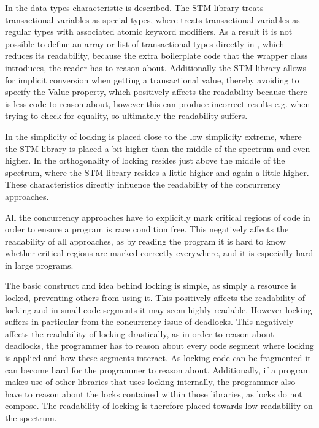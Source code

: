 In  the data types characteristic is described. The \ac{STM} library treats transactional variables as special types, where \stmname treats transactional variables as regular types with associated atomic keyword modifiers. As a result it is not possible to define an array or list of transactional types directly in \stmname, which reduces its readability, because the extra boilerplate code that the wrapper class introduces, the reader has to reason about. Additionally the \ac{STM} library allows for implicit conversion when getting a transactional value, thereby avoiding to specify the Value property, which positively affects the readability because there is less code to reason about, however this can produce incorrect results e.g. when trying to check for equality, so ultimately the readability suffers.

In  the simplicity of locking is placed close to the low simplicity extreme, where the \ac{STM} library is placed a bit higher than the middle of the spectrum and \stmname even higher. In  the orthogonality of locking resides just above the middle of the spectrum, where the \ac{STM} library resides a little higher and \stmname again a little higher. These characteristics directly influence the readability of the concurrency approaches.

All the concurrency approaches have to explicitly mark critical regions of code in order to ensure a program is race condition free. This negatively affects the readability of all approaches, as by reading the program it is hard to know whether critical regions are marked correctly everywhere, and it is especially hard in large programs.

The basic  construct and idea behind locking is simple, as simply a resource is locked, preventing others from using it. This positively affects the readability of locking and in small code segments it may seem highly readable. However locking suffers in particular from the concurrency issue of deadlocks. This negatively affects the readability of locking drastically, as in order to reason about deadlocks, the programmer has to reason about every code segment where locking is applied and how these segments interact. As locking code can be fragmented it can become hard for the programmer to reason about. Additionally, if a program makes use of other libraries that uses locking internally, the programmer also have to reason about the locks contained within those libraries, as locks do not compose. The readability of locking is therefore placed towards low readability on the spectrum.

